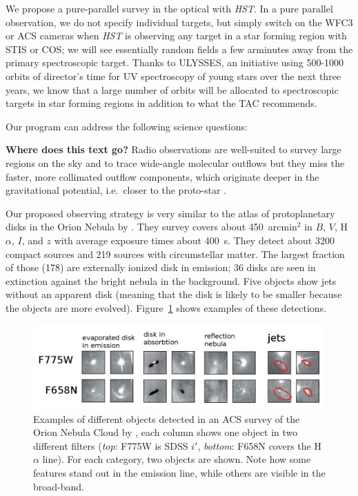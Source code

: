 \documentclass[12pt]{article}
\begin{document}
We propose a pure-parallel survey in the optical with \emph{HST}. In a pure parallel observation, we do not specify individual targets, but simply switch on the WFC3 or ACS cameras when \emph{HST} is observing any target in a star forming region with STIS or COS; we will see essentially random fields a few arminutes away from the primary spectroscopic target. Thanks to ULYSSES, an initiative using 500-1000 orbits of director's time for UV spectroscopy of young stars over the next three years, we know that a large number of orbits will be allocated to spectroscopic targets in star forming regions in addition to what the TAC recommends.

Our program can address the following science questions:

\textbf{Where does this text go?} Radio observations are well-suited to survey large regions on the sky and to trace wide-angle molecular outflows \citep[e.g.][]{2003MNRAS.341..707C} but they miss the faster, more collimated outflow components, which originate deeper in the gravitational potential, i.e.\ closer to the proto-star \citep{2003ApJ...590L.107A}.

Our proposed observing strategy is very similar to the atlas of protoplanetary disks in the Orion Nebula by \citet{2008AJ....136.2136R}. They survey covers about 450~arcmin$^2$ in $B$, $V$, H$\alpha$, $I$, and $z$ with average exposure times about 400~s. They detect about 3200 compact sources and 219 sources with circumstellar matter. The largest fraction of those (178) are externally ionized disk in emission; 36 disks are seen in extinction against the bright nebula in the background. Five objects show jets without an apparent disk (meaning that the disk is likely to be smaller because the objects are more evolved). Figure~\ref{fig:ONCACS} shows examples of these detections. 

\begin{figure}
    \centering
    \includegraphics[width=\textwidth]{ONCACS.png}
    \caption{Examples of different objects detected in an ACS survey of the Orion Nebula Cloud by \citet{2008AJ....136.2136R}, each column shows one object in two different filters (\emph{top}: F775W is SDSS $i'$, \emph{bottom}: F658N covers the H$\alpha$ line). For each category, two objects are shown. Note how some features stand out in the emission line, while others are visible in the broad-band.}
    \label{fig:ONCACS}
\end{figure}
\end{document}
